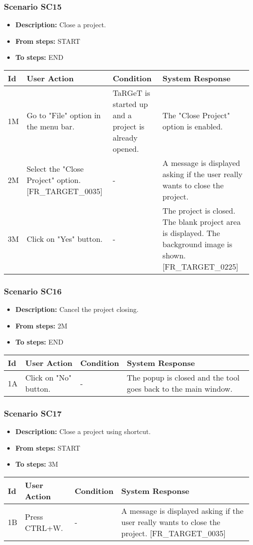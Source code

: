 \documentclass[a4paper,11pt]{article}
\newcommand{\bl}{\\ \hline}
\begin{document}
\subsubsection*{Scenario SC15}
\begin{itemize}
\item {\bf Description:} Close a project.
\item {\bf From steps:} START
\item {\bf To steps:} END
\end{itemize}
\begin{tabular}{|p{0.4in}|p{1.5in}|p{1.5in}|p{1.5in}|}
\hline
Id & User Action & Condition & System Response \bl 
1M & Go to "File" option in the menu bar.   & TaRGeT is started up and a project is already opened.
					 & The "Close Project" option is enabled. \bl
2M & Select the "Close Project" option. [FR_TARGET_0035]
					 & - & A message is displayed asking if the user really wants to
						close the project. \bl
3M & Click on "Yes" button. & - & The project is closed. The blank project area is
						displayed. The background image is shown. [FR_TARGET_0225]
					\bl
\end{tabular}
\subsubsection*{Scenario SC16}
\begin{itemize}
\item {\bf Description:} Cancel the project closing.
\item {\bf From steps:} 2M
\item {\bf To steps:} END
\end{itemize}
\begin{tabular}{|p{0.4in}|p{1.5in}|p{1.5in}|p{1.5in}|}
\hline
Id & User Action & Condition & System Response \bl 
1A & Click on "No" button. & - & The popup is closed and the tool goes back to the main
						window.\bl
\end{tabular}
\subsubsection*{Scenario SC17}
\begin{itemize}
\item {\bf Description:} Close a project using shortcut.
\item {\bf From steps:} START
\item {\bf To steps:} 3M
\end{itemize}
\begin{tabular}{|p{0.4in}|p{1.5in}|p{1.5in}|p{1.5in}|}
\hline
Id & User Action & Condition & System Response \bl 
1B & Press CTRL+W. & - & A message is displayed asking if the user really wants to
						close the project. [FR_TARGET_0035]\bl
\end{tabular}
\end{document}
